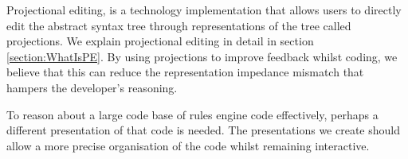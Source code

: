 Projectional editing, is a technology implementation that allows users to directly edit the abstract syntax tree through representations of the tree called projections.
We explain projectional editing in detail in section \ref{section:WhatIsPE}.
By using projections to improve feedback whilst coding, we believe that this can reduce the representation impedance mismatch that hampers the developer's reasoning.

To reason about a large code base of rules engine code effectively, perhaps a different presentation of that code is needed.
The presentations we create should allow a more precise organisation of the code whilst remaining interactive.



